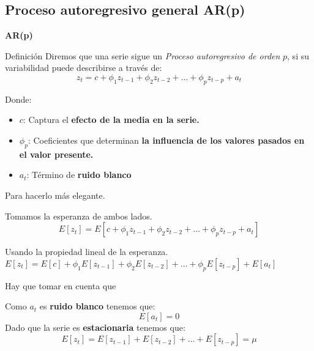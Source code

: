 \documentclass[11pt]{beamer}
\begin{document}
\subsection{Proceso autoregresivo general AR(p)}
\begin{frame}{\textbf{AR(p)}}
\begin{block}{Definición}
Diremos que una serie sigue un \textit{Proceso autoregresivo de orden} $p$, si su variabilidad puede describirse a través de: 
\begin{equation}
	z_t = c + \phi_1 z_{t-1} + \phi_2 z_{t-2} + \dots + \phi_p z_{t-p} + a_t
\end{equation}
\end{block}

\begin{block}{Donde:}
\begin{itemize}
	\item $c$: Captura el \textbf{efecto de la media en la serie.}
	\item $\phi_p$: Coeficientes que determinan \textbf{la influencia de los valores pasados en el valor presente.}
	\item $a_t$: Término de \textbf{ruido blanco}
\end{itemize}
\end{block}
\end{frame}

\begin{frame}{Para hacerlo más elegante.}
\begin{block}{Tomamos la esperanza de ambos lados.}
$$ E[z_t] = E[c + \phi_1 z_{t-1} + \phi_2 z_{t-2} + \dots + \phi_p z_{t-p} + a_t] $$
\end{block}
\begin{block}{Usando la propiedad lineal de la esperanza.}
$ E[z_t] = E[c] + \phi_1 E[z_{t-1}] + \phi_2 E[z_{t-2}] + \dots + \phi_p E[z_{t-p}] + E[a_t] $
\end{block}
\end{frame}

\begin{frame}{Hay que tomar en cuenta que}
\begin{block}{}
Como $a_t$ es \textbf{ruido blanco} tenemos que:
\begin{equation}
	E[a_t] = 0
\end{equation}
Dado que la serie es \textbf{estacionaria} tenemos que:
\begin{equation}
	E[z_t] = E[z_{t-1}] + E[z_{t-2}] + \dots + E[z_{t-p}] = \mu
\end{equation}
\end{block}
\end{frame}
\end{document}
